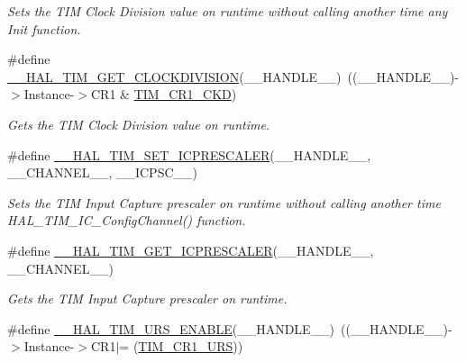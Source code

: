 \begin{DoxyCompactItemize}
\begin{DoxyCompactList}\small\item\em Sets the T\-I\-M Clock Division value on runtime without calling another time any Init function. \end{DoxyCompactList}\item 
\#define \hyperlink{group___t_i_m___exported___macros_gae6bc91bb5940bce52828c690f24001b8}{\-\_\-\-\_\-\-H\-A\-L\-\_\-\-T\-I\-M\-\_\-\-G\-E\-T\-\_\-\-C\-L\-O\-C\-K\-D\-I\-V\-I\-S\-I\-O\-N}(\-\_\-\-\_\-\-H\-A\-N\-D\-L\-E\-\_\-\-\_\-)~((\-\_\-\-\_\-\-H\-A\-N\-D\-L\-E\-\_\-\-\_\-)-\/$>$Instance-\/$>$C\-R1 \& \hyperlink{group___peripheral___registers___bits___definition_gacacc4ff7e5b75fd2e4e6b672ccd33a72}{T\-I\-M\-\_\-\-C\-R1\-\_\-\-C\-K\-D})
\begin{DoxyCompactList}\small\item\em Gets the T\-I\-M Clock Division value on runtime. \end{DoxyCompactList}\item 
\#define \hyperlink{group___t_i_m___exported___macros_gaeb106399b95ef02cec502f58276a0e92}{\-\_\-\-\_\-\-H\-A\-L\-\_\-\-T\-I\-M\-\_\-\-S\-E\-T\-\_\-\-I\-C\-P\-R\-E\-S\-C\-A\-L\-E\-R}(\-\_\-\-\_\-\-H\-A\-N\-D\-L\-E\-\_\-\-\_\-, \-\_\-\-\_\-\-C\-H\-A\-N\-N\-E\-L\-\_\-\-\_\-, \-\_\-\-\_\-\-I\-C\-P\-S\-C\-\_\-\-\_\-)
\begin{DoxyCompactList}\small\item\em Sets the T\-I\-M Input Capture prescaler on runtime without calling another time H\-A\-L\-\_\-\-T\-I\-M\-\_\-\-I\-C\-\_\-\-Config\-Channel() function. \end{DoxyCompactList}\item 
\#define \hyperlink{group___t_i_m___exported___macros_gabfeec6b3c67a5747c7dbd20aff61d8e2}{\-\_\-\-\_\-\-H\-A\-L\-\_\-\-T\-I\-M\-\_\-\-G\-E\-T\-\_\-\-I\-C\-P\-R\-E\-S\-C\-A\-L\-E\-R}(\-\_\-\-\_\-\-H\-A\-N\-D\-L\-E\-\_\-\-\_\-, \-\_\-\-\_\-\-C\-H\-A\-N\-N\-E\-L\-\_\-\-\_\-)
\begin{DoxyCompactList}\small\item\em Gets the T\-I\-M Input Capture prescaler on runtime. \end{DoxyCompactList}\item 
\#define \hyperlink{group___t_i_m___exported___macros_ga3b06856bd6d7e10cfff342b1726db51d}{\-\_\-\-\_\-\-H\-A\-L\-\_\-\-T\-I\-M\-\_\-\-U\-R\-S\-\_\-\-E\-N\-A\-B\-L\-E}(\-\_\-\-\_\-\-H\-A\-N\-D\-L\-E\-\_\-\-\_\-)~((\-\_\-\-\_\-\-H\-A\-N\-D\-L\-E\-\_\-\-\_\-)-\/$>$Instance-\/$>$C\-R1$\vert$= (\hyperlink{group___peripheral___registers___bits___definition_ga06c997c2c23e8bef7ca07579762c113b}{T\-I\-M\-\_\-\-C\-R1\-\_\-\-U\-R\-S}))

\end{DoxyCompactItemize}
